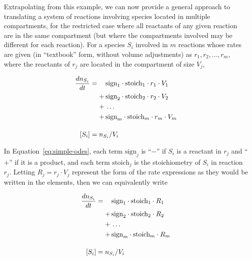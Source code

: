 Extrapolating from this example, we can now provide a general
approach to translating a system of reactions involving species
located in multiple compartments, for the restricted case where
all reactants of any given reaction are in the same compartment
(but where the compartments involved may be different for each
reaction).  For a species $S_i$ involved in $m$
  reactions whose rates are given (in ``textbook'' form, without
volume adjustments) as $r_1, r_2, \ldots, r_m$, where the
reactants of $r_j$ are located in the compartment of size $V_j$,
\begin{linenomath}
\begin{equation} \label{eq:simple-odes}
  \begin{split}
    \frac{dn_{S_i}}{dt} &= \relphantom{+}\,\text{sign}_1 \cdot \text{stoich}_1 \cdot r_1 \cdot V_1\\
    &\relphantom{=} +\, \text{sign}_2 \cdot \text{stoich}_2 \cdot r_2 \cdot V_2\\
    &\relphantom{=} +\, \ldots \\
    &\relphantom{=} +\, \text{sign}_m \cdot \text{stoich}_m \cdot r_m \cdot V_m\\
    \\[-4pt]
    [S_i] &= n_{S_i}/V_i
  \end{split}
\end{equation}
\end{linenomath}
In Equation~\eqref{eq:simple-odes}, each term $\text{sign}_j$ is
``$-$'' if $S_i$ is a reactant in $r_j$ and ``$+$'' if it is a
product, and each term $\text{stoich}_j$ is the stoichiometry of
$S_i$ in reaction $r_j$.  Letting $R_j = r_j \cdot V_j$ represent
the form of the rate expressions as they would be written in the
\KineticLaw {} elements, then we can equivalently write
\begin{linenomath}
\begin{equation} \label{eq:simple-odes-sbml}
  \begin{split}
    \frac{dn_{S_i}}{dt} &= \relphantom{+}\,\text{sign}_1 \cdot \text{stoich}_1 \cdot R_1\\
    &\relphantom{=} +\, \text{sign}_2 \cdot \text{stoich}_2 \cdot R_2\\
    &\relphantom{=} +\, \ldots \\
    &\relphantom{=} +\, \text{sign}_m \cdot \text{stoich}_m \cdot R_m\\
    \\[-4pt]
    [S_i] &= n_{S_i}/V_i
  \end{split}
\end{equation}
\end{linenomath}%

